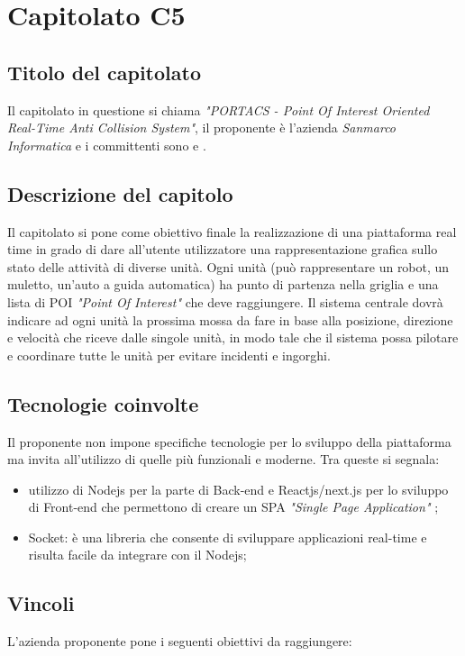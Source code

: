 \section{Capitolato C5}
\subsection{Titolo del capitolato}
Il capitolato in questione si chiama \textit{"PORTACS - Point Of Interest  Oriented Real-Time Anti Collision System"}, il proponente \`e l'azienda \textit{Sanmarco Informatica} e i committenti sono \VT{} e \CR{}.

\subsection{Descrizione del capitolo}
Il capitolato si pone come obiettivo finale la realizzazione di una piattaforma real time in grado di dare all'utente utilizzatore una rappresentazione grafica sullo stato delle attività di diverse unità. Ogni unità (può rappresentare un robot, un muletto, un'auto a guida automatica) ha punto di partenza nella griglia e una lista di POI \textit{"Point Of Interest"}  che deve raggiungere. Il sistema centrale dovrà indicare ad ogni unità la prossima mossa da fare in base alla posizione, direzione e velocità che riceve dalle singole unità, in modo tale che il sistema possa pilotare e coordinare tutte le unità per evitare incidenti e ingorghi.



\subsection{Tecnologie coinvolte}
Il proponente non impone specifiche tecnologie per lo sviluppo della piattaforma ma invita all'utilizzo di quelle più funzionali e moderne.
Tra queste si segnala: 
\begin{itemize}
\item utilizzo di Nodejs per la parte di Back-end e Reactjs/next.js  per lo sviluppo di Front-end che permettono di creare un SPA \textit{"Single Page Application"} ;
\item Socket: è una libreria che consente di sviluppare applicazioni real-time e risulta facile da integrare con il Nodejs;
\end{itemize}

\subsection{Vincoli}
L'azienda proponente pone i seguenti obiettivi da raggiungere:

